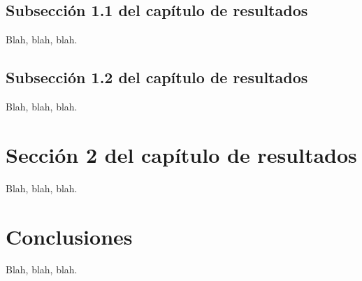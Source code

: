 \subsection{Subsección 1.1 del capítulo de resultados}
\label{sec:results-11}

Blah, blah, blah.


\subsection{Subsección 1.2 del capítulo de resultados}
\label{sec:results-12}

Blah, blah, blah.




\section{Sección 2 del capítulo de resultados}
\label{sec:results-2}

Blah, blah, blah.




\section{Conclusiones}
\label{sec:results-conclusions}

Blah, blah, blah.


